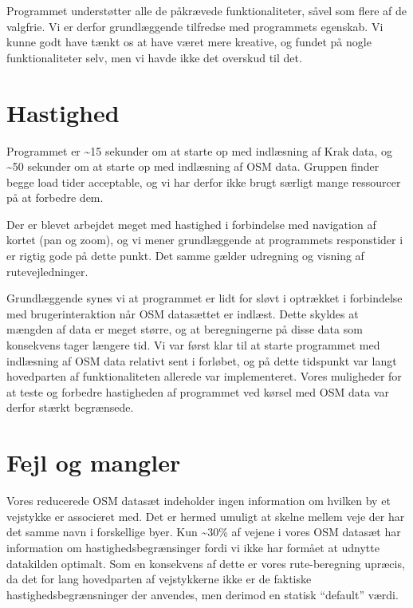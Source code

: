 Programmet understøtter alle de påkrævede funktionaliteter, såvel som flere af de valgfrie. Vi er derfor grundlæggende tilfredse med programmets egenskab. Vi kunne godt have tænkt os at have været mere kreative, og fundet på nogle funktionaliteter selv, men vi havde ikke det overskud til det.

\section{Hastighed}
\label{sec:hastighed}

Programmet er \textasciitilde15 sekunder om at starte op med indlæsning af Krak data, og \textasciitilde50 sekunder om at starte op med indlæsning af OSM data. Gruppen finder begge load tider acceptable, og vi har derfor ikke brugt særligt mange ressourcer på at forbedre dem.

Der er blevet arbejdet meget med hastighed i forbindelse med navigation af kortet (pan og zoom), og vi mener grundlæggende at programmets responstider i er rigtig gode på dette punkt. Det samme gælder udregning og visning af rutevejledninger.

Grundlæggende synes vi at programmet er lidt for sløvt i optrækket i forbindelse med brugerinteraktion når OSM datasættet er indlæst. Dette skyldes at mængden af data er meget større, og at beregningerne på disse data som konsekvens tager længere tid. Vi var først klar til at starte programmet med indlæsning af OSM data relativt sent i forløbet, og på dette tidspunkt var langt hovedparten af funktionaliteten allerede var implementeret. Vores muligheder for at teste og forbedre hastigheden af programmet ved kørsel med OSM data var derfor stærkt begrænsede.

\section{Fejl og mangler}
\label{sec:fejlOgMangler}

Vores reducerede OSM datasæt indeholder ingen information om hvilken by et vejstykke er associeret med. Det er hermed umuligt at skelne mellem veje der har det samme navn i forskellige byer. Kun \textasciitilde30\% af vejene i vores OSM datasæt har information om hastighedsbegrænsinger fordi vi ikke har formået at udnytte datakilden optimalt. Som en konsekvens af dette er vores rute-beregning upræcis, da det for lang hovedparten af vejstykkerne ikke er de faktiske hastighedsbegrænsninger der anvendes, men derimod en statisk ``default'' værdi.

